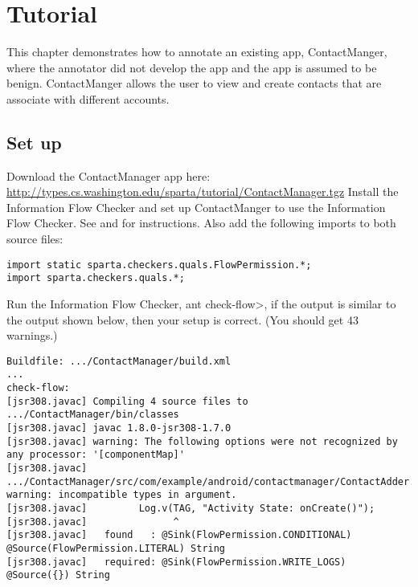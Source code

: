 \htmlhr


\newcommand{\method}[1]{\paragraph{#1}}
\newcommand{\annomethod}[1]{\small{\texttt{#1}}\newline}
\chapter{Tutorial\label{tutorial}}

This chapter demonstrates how to annotate an existing app, ContactManger,
 where the annotator did not develop the app and the app is assumed to be benign.
   ContactManger allows the user to view and create contacts that are associate 
   with different accounts.  


\section{Set up}
Download the ContactManager app here: \url{http://types.cs.washington.edu/sparta/tutorial/ContactManager.tgz}
Install the Information Flow Checker and set up ContactManger to use the Information Flow Checker. 
See   and  for instructions. Also add 
the following imports to both source files:
\begin{Verbatim} 
import static sparta.checkers.quals.FlowPermission.*;
import sparta.checkers.quals.*;
\end{Verbatim}

Run the Information Flow Checker, \<ant check-flow>, if the output is similar to 
the output shown below, then your setup is correct.  (You should get 43 warnings.)

\begin{Verbatim}
Buildfile: .../ContactManager/build.xml
...
check-flow:
[jsr308.javac] Compiling 4 source files to .../ContactManager/bin/classes
[jsr308.javac] javac 1.8.0-jsr308-1.7.0
[jsr308.javac] warning: The following options were not recognized by any processor: '[componentMap]'
[jsr308.javac] .../ContactManager/src/com/example/android/contactmanager/ContactAdder.java:75: warning: incompatible types in argument.
[jsr308.javac]         Log.v(TAG, "Activity State: onCreate()");
[jsr308.javac]               ^
[jsr308.javac]   found   : @Sink(FlowPermission.CONDITIONAL) @Source(FlowPermission.LITERAL) String
[jsr308.javac]   required: @Sink(FlowPermission.WRITE_LOGS) @Source({}) String
\end{Verbatim} 

